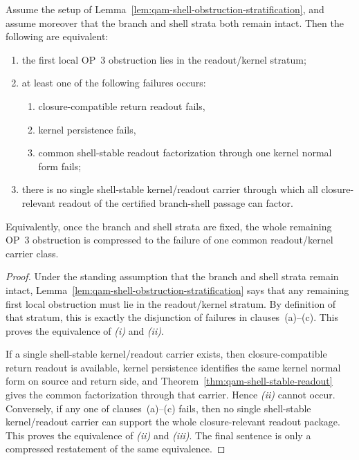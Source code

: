 \begin{lemma}\label{lem:qam-readout-kernel-obstruction-compression}
Assume the setup of Lemma~\ref{lem:qam-shell-obstruction-stratification}, and assume moreover that the branch and shell strata both remain intact. Then the following are equivalent:
\begin{enumerate}[leftmargin=2em,label=(\roman*)]
  \item the first local OP~3 obstruction lies in the readout/kernel stratum;
  \item at least one of the following failures occurs:
  \begin{enumerate}[leftmargin=2em,label=(\alph*)]
    \item closure-compatible return readout fails,
    \item kernel persistence fails,
    \item common shell-stable readout factorization through one kernel normal form fails;
  \end{enumerate}
  \item there is no single shell-stable kernel/readout carrier through which all closure-relevant readout of the certified branch-shell passage can factor.
\end{enumerate}
Equivalently, once the branch and shell strata are fixed, the whole remaining OP~3 obstruction is compressed to the failure of one common readout/kernel carrier class.
\end{lemma}

\begin{proof}
Under the standing assumption that the branch and shell strata remain intact, Lemma~\ref{lem:qam-shell-obstruction-stratification} says that any remaining first local obstruction must lie in the readout/kernel stratum. By definition of that stratum, this is exactly the disjunction of failures in clauses~(a)--(c). This proves the equivalence of \emph{(i)} and \emph{(ii)}.

If a single shell-stable kernel/readout carrier exists, then closure-compatible return readout is available, kernel persistence identifies the same kernel normal form on source and return side, and Theorem~\ref{thm:qam-shell-stable-readout} gives the common factorization through that carrier. Hence \emph{(ii)} cannot occur. Conversely, if any one of clauses~(a)--(c) fails, then no single shell-stable kernel/readout carrier can support the whole closure-relevant readout package. This proves the equivalence of \emph{(ii)} and \emph{(iii)}. The final sentence is only a compressed restatement of the same equivalence.
\end{proof}

